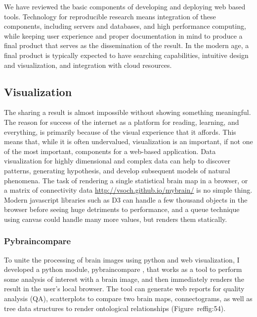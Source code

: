 \documentclass{report}
\begin{document}
We have reviewed the basic components of developing and deploying web
based tools. Technology for reproducible research means integration of
these components, including servers and databases, and high performance
computing, while keeping user experience and proper documentation in
mind to produce a final product that serves as the dissemination of the
result. In the modern age, a final product is typically expected to have
searching capabilities, intuitive design and visualization, and
integration with cloud resources.

\subsection{Visualization}

The sharing a result is almost impossible without showing something
meaningful. The reason for success of the internet as a platform for
reading, learning, and everything, is primarily because of the visual
experience that it affords. This means that, while it is often
undervalued, visualization is an important, if not one of the most
important, components for a web-based application. Data visualization
for highly dimensional and complex data can help to discover patterns,
generating hypothesis, and develop subsequent models of natural
phenomena. The task of rendering a single statistical brain map in a
browser, or a matrix of connectivity data \href{http://vsoch.github.io/mybrain/}{http://vsoch.github.io/mybrain/} is no simple thing. Modern javascript libraries such as D3 \cite{Bostock2011-ei} can
handle a few thousand objects in the browser before seeing huge
detriments to performance, and a queue technique using canvas \cite{noauthor_undated-hy} could
handle many more values, but renders them statically.

\subsubsection{Pybraincompare}

To unite the processing of brain images using python and web
visualization, I developed a python module, pybraincompare \cite{noauthor_undated-hu},
that works as a tool to perform some analysis of interest with a brain
image, and then immediately renders the result in the user's local
browser. The tool can generate web reports for quality analysis (QA),
scatterplots to compare two brain maps, connectograms, as well as tree
data structures to render ontological relationships (Figure~ref{fig:54}).
\end{document}
